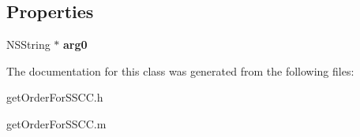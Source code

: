 \subsection*{Properties}
\begin{DoxyCompactItemize}
\item 
\hypertarget{interfaceget_order_for_s_s_c_c_a600e795c17fed068714880b29c891b20}{}N\+S\+String $\ast$ {\bfseries arg0}\label{interfaceget_order_for_s_s_c_c_a600e795c17fed068714880b29c891b20}

\end{DoxyCompactItemize}


The documentation for this class was generated from the following files\+:\begin{DoxyCompactItemize}
\item 
get\+Order\+For\+S\+S\+C\+C.\+h\item 
get\+Order\+For\+S\+S\+C\+C.\+m\end{DoxyCompactItemize}
